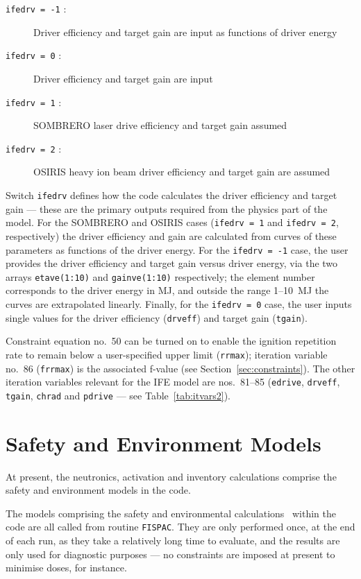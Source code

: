 \documentclass[11pt,a4paper]{report}
\begin{document}
\begin{description}
\item [\texttt{ifedrv = -1} :] Driver efficiency and target gain are input as
  functions of driver energy
\item [\texttt{ifedrv = 0} :] Driver efficiency and target gain are input
\item [\texttt{ifedrv = 1} :] SOMBRERO laser drive efficiency and target gain assumed
\item [\texttt{ifedrv = 2} :] OSIRIS heavy ion beam driver efficiency and
  target gain are assumed~\cite{ife_driver}
\end{description}
Switch \texttt{ifedrv} defines how the code calculates the driver efficiency
and target gain --- these are the primary outputs required from the physics
part of the model. For the SOMBRERO and OSIRIS cases (\texttt{ifedrv = 1} and
\texttt{ifedrv = 2}, respectively) the driver efficiency and gain are
calculated from curves of these parameters as functions of the driver
energy. For the \texttt{ifedrv = -1} case, the user provides the driver
efficiency and target gain versus driver energy, via the two arrays
\texttt{etave(1:10)} and \texttt{gainve(1:10)} respectively; the element number
corresponds to the driver energy in MJ, and outside the range 1--10~MJ the
curves are extrapolated linearly. Finally, for the \texttt{ifedrv = 0} case,
the user inputs single values for the driver efficiency (\texttt{drveff}) and
target gain (\texttt{tgain}).

Constraint equation no.\ 50 can be turned on to enable the ignition repetition
rate to remain below a user-specified upper limit (\texttt{rrmax}); iteration
variable no.\ 86 (\texttt{frrmax}) is the associated f-value (see
Section~\ref{sec:constraints}). The other iteration variables relevant for the
IFE model are nos.~81--85 (\texttt{edrive}, \texttt{drveff}, \texttt{tgain},
\texttt{chrad} and \texttt{pdrive} --- see Table~\ref{tab:itvars2}).

\section{Safety and Environment Models}

At present, the neutronics, activation and inventory calculations comprise the
safety and environment models in the code.

The models comprising the safety and environmental calculations~\cite{FISPACT}
within the code are all called from routine \texttt{FISPAC}. They are only
performed once, at the end of each run, as they take a relatively long time to
evaluate, and the results are only used for diagnostic purposes --- no
constraints are imposed at present to minimise doses, for instance.
\end{document}

